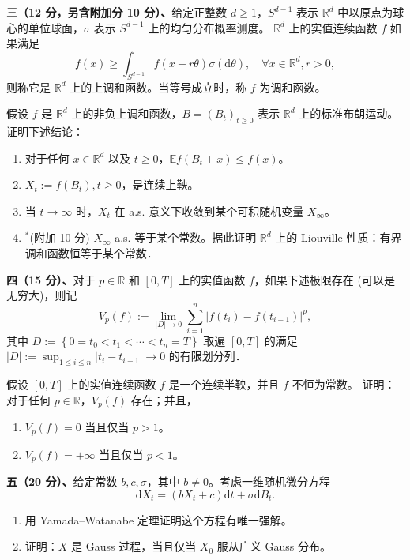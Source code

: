 \textbf{三（12 分，另含附加分 10 分）、}给定正整数 $d \geq 1$，$S^{d-1}$ 表示 $\mathbb{R}^{d}$ 中以原点为球心的单位球面，$\sigma$ 表示 $S^{d-1}$ 上的均匀分布概率测度。
$\mathbb{R}^{d}$ 上的实值连续函数 $f$ 如果满足
$$f(x) \geq \int_{S^{d-1}} f(x+r \theta) \sigma(\mathrm{d} \theta), 
\quad \forall x \in \mathbb{R}^{d}, r>0,$$
则称它是 $\mathbb{R}^{d}$ 上的上调和函数。当等号成立时，称 $f$ 为调和函数。

假设 $f$ 是 $\mathbb{R}^{d}$ 上的非负上调和函数，$B=\left(B_{t}\right)_{t \geq 0}$ 表示 $\mathbb{R}^{d}$ 上的标准布朗运动。证明下述结论：
\begin{enumerate}[label=(\arabic*)]
\item 对于任何 $x \in \mathbb{R}^{d}$ 以及 $t \geq 0$，$\mathbb{E} f(B_{t}+x) \leq f(x)$。

\item $X_{t}:=f(B_{t}), t \geq 0$，是连续上鞅。

\item 当 $t \rightarrow \infty$ 时，$X_{t}$ 在 a.s. 意义下收敛到某个可积随机变量 $X_{\infty}$。

\item ${}^*$(附加 10 分) $X_{\infty}$ a.s. 等于某个常数。据此证明 $\mathbb{R}^{d}$ 上的 Liouville 性质：有界调和函数恒等于某个常数．
\end{enumerate}

\textbf{四（15 分）、}对于 $p \in \mathbb{R}$ 和 $[0, T]$ 上的实值函数 $f$，如果下述极限存在 (可以是无穷大)，则记
$$V_{p}(f):=\lim_{|D| \rightarrow 0} \sum_{i=1}^{n} |f(t_{i})-f(t_{i-1})|^{p},$$
其中 $D:=\left\{0=t_{0}<t_{1}<\cdots<t_{n}=T\right\}$ 取遍 $[0, T]$ 的满足 $|D|:=\sup_{1 \leq i \leq n}\left|t_{i}-t_{i-1}\right| \rightarrow 0$ 的有限划分列．

假设 $[0, T]$ 上的实值连续函数 $f$ 是一个连续半鞅，并且 $f$ 不恒为常数。
证明：对于任何 $p \in \mathbb{R}$，$V_{p}(f)$ 存在；并且，
\begin{enumerate}[label=(\arabic*)]
\item $V_{p}(f)=0$ 当且仅当 $p>1$。

\item $V_{p}(f)=+\infty$ 当且仅当 $p<1$。
\end{enumerate}


\textbf{五（20 分）、}给定常数 $b, c, \sigma$，其中 $b \neq 0$。考虑一维随机微分方程
$$\mathrm{d} X_{t}=(b X_{t}+c) \mathrm{d} t+\sigma \mathrm{d} B_{t}.$$
\begin{enumerate}[label=(\arabic*)]
\item 用 Yamada--Watanabe 定理证明这个方程有唯一强解。

\item 证明：$X$ 是 Gauss 过程，当且仅当 $X_{0}$ 服从广义 Gauss 分布。
\end{enumerate}

